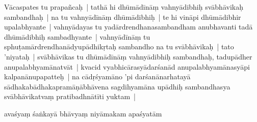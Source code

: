 \documentclass[article,12pt,a4paper]{memoir}%
\newcounter{parCount}
\begin{document}
	  
	  \pstart \leavevmode%
	\label{thakur75-106.27}Vācaspates tu prapañcaḥ | tathā hi dhūmādīnāṃ vahnyādibhiḥ svābhāvikaḥ sambandhaḥ | na tu vahnyādīnāṃ dhūmādibhiḥ | te hi vināpi dhūmādibhir upalabhyante | vahnyādayas tu yadārdrendhanasambandham anubhavanti tadā dhūmādibhiḥ sambadhyante | vahnyādīnāṃ tu sphuṭamārdrendhanādyupādhikṛtaḥ sambandho na tu svābhāvikaḥ | tato 'niyataḥ | svābhāvikas tu dhūmādīnāṃ vahnyādibhiḥ sambandhaḥ, tadupādher anupalabhyamānatvāt | kvacid vyabhicārasyādarśanād anupalabhyamānasyāpi kalpanānupapatteḥ | na cādṛśyamāno 'pi darśanānarhatayā sādhakabādhakapramāṇābhāvena sagdihyamāna upādhiḥ sambandhasya svābhāvikatvaṃ pratibadhnātīti yuktam |
	{}
	\pend%
      

	  
	  \pstart \leavevmode%
	avaśyaṃ śaṅkayā bhāvyaṃ niyāmakam apaśyatām 
	{}
	\pend%
      
\end{document}
